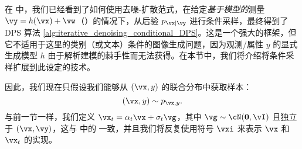 \documentclass[../../book-main.tex]{subfiles}
\begin{document}
在  中，我们已经看到了如何使用去噪-扩散范式，在给定\textit{基于模型的}测量 $\vy = h(\vx) + \vw$（）的情况下，从后验 $p_{\vx \mid \vy}$ 进行条件采样，最终得到了 DPS 算法 \eqref{alg:iterative_denoising_conditional_DPS}。这是一个强大的框架，但它不适用于这里的类别（或文本）条件的图像生成问题，因为观测/属性 $y$ 的显式生成模型 $h$ 由于解析建模的棘手性而无法获得。在本节中，我们将介绍将条件采样扩展到此设定的技术。


因此，我们现在只假设我们能够从 $(\vx, y)$ 的联合分布中获取样本：
\begin{equation}
  (\vx, y) \sim p_{\vx, y}.
\end{equation}
与前一节一样，我们定义 $\vx_t = \alpha_t \vx + \sigma_t \vg$，其中 $\vg \sim \cN(\Zero, \vI)$ 且独立于 $(\vx, \vy)$，这与  中的  一致，并且我们将反复使用符号 $\vxi$ 来表示 $\vx$ 和 $\vx_t$ 的实现。
\end{document}
